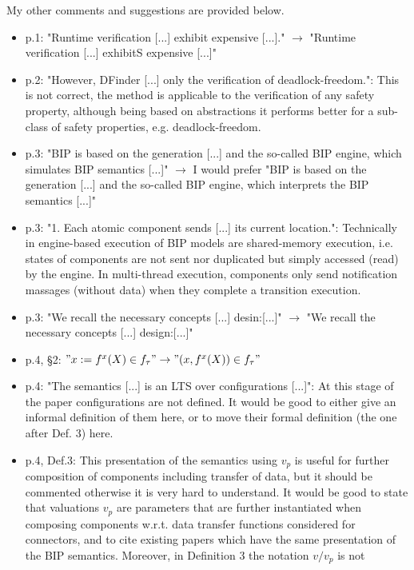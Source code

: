 

My other comments and suggestions are provided below.

\begin{itemize}
\item p.1: "Runtime verification [...] exhibit expensive [...]." $\rightarrow$ "Runtime 
verification [...] exhibitS expensive [...]"
\item p.2: "However, DFinder [...] only the verification of deadlock-freedom.": 
This is not correct, the method is applicable to the verification of any 
safety property, although being based on abstractions it performs better for 
a sub-class of safety properties, e.g. deadlock-freedom.
\item p.3: "BIP is based on the generation [...] and the so-called BIP engine, 
which simulates BIP semantics [...]" $\rightarrow$ I would prefer "BIP is based on the 
generation [...] and the so-called BIP engine, which interprets the BIP 
semantics [...]"
\item p.3: "1. Each atomic component sends [...] its current location.": 
Technically in engine-based execution of BIP models are shared-memory 
execution, i.e. states of components are not sent nor duplicated but simply 
accessed (read) by the engine. In multi-thread execution, components only 
send notification massages (without data) when they complete a transition 
execution.
\item p.3: "We recall the necessary concepts [...] desin:[...]" $\rightarrow$ "We recall the 
necessary concepts [...] design:[...]"
\item p.4, §2: $"x := f^x(X) \in f_{\tau}" \rightarrow "(x,f^x(X)) \in f_{\tau}"$
\item p.4: "The semantics [...] is an LTS over configurations [...]": At this 
stage of the paper configurations are not defined. It would be good to either 
give an informal definition of them here, or to move their formal definition 
(the one after Def. 3) here.
\item p.4, Def.3: This presentation of the semantics using $v_p$ is useful for 
further composition of components including transfer of data, but it should 
be commented otherwise it is very hard to understand. It would be good to 
state that valuations $v_p$ are parameters that are further instantiated when 
composing components w.r.t. data transfer functions considered for 
connectors, and to cite existing papers which have the same presentation of 
the BIP semantics. Moreover, in Definition 3 the notation $v/v_p$ is not 

\end{itemize}
